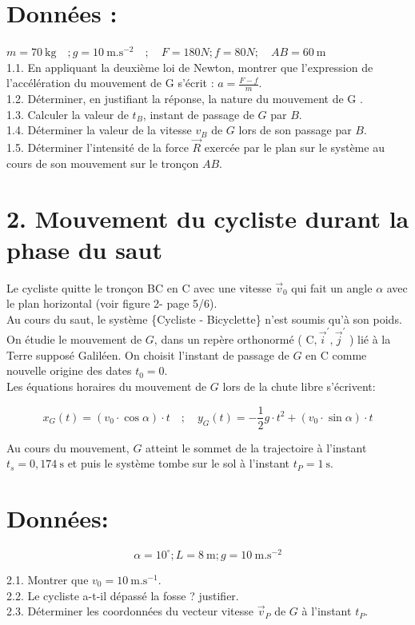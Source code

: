 \section*{Données :}
$m=70 \mathrm{~kg} \quad ; g=10 \mathrm{~m} . \mathrm{s}^{-2} \quad ; \quad F=180 N ; f=80 N ; \quad A B=60 \mathrm{~m}$\\
1.1. En appliquant la deuxième loi de Newton, montrer que l'expression de l'accélération du mouvement de G s'écrit : $a=\frac{F-f}{m}$.\\
1.2. Déterminer, en justifiant la réponse, la nature du mouvement de G .\\
1.3. Calculer la valeur de $t_{B}$, instant de passage de $G$ par $B$.\\
1.4. Déterminer la valeur de la vitesse $v_{B}$ de $G$ lors de son passage par $B$.\\
1.5. Déterminer l'intensité de la force $\vec{R}$ exercée par le plan sur le système au cours de son mouvement sur le tronçon $A B$.

\section*{2. Mouvement du cycliste durant la phase du saut}
Le cycliste quitte le tronçon BC en C avec une vitesse $\vec{v}_{0}$ qui fait un angle $\alpha$ avec le plan horizontal (voir figure 2- page 5/6).\\
Au cours du saut, le système \{Cycliste - Bicyclette\} n'est soumis qu'à son poids. On étudie le mouvement de $G$, dans un repère orthonormé ( $\mathrm{C}, \vec{i}^{\prime}, \vec{j}^{\prime}$ ) lié à la Terre supposé Galiléen. On choisit l'instant de passage de $G$ en C comme nouvelle origine des dates $t_{0}=0$.\\
Les équations horaires du mouvement de $G$ lors de la chute libre s'écrivent:

$$
x_{G}(t)=\left(v_{0} \cdot \cos \alpha\right) \cdot t \quad ; \quad y_{G}(t)=-\frac{1}{2} g \cdot t^{2}+\left(v_{0} \cdot \sin \alpha\right) \cdot t
$$

Au cours du mouvement, $G$ atteint le sommet de la trajectoire à l'instant $t_{s}=0,174 \mathrm{~s}$ et puis le système tombe sur le sol à l'instant $t_{P}=1 \mathrm{~s}$.

\section*{Données:}
$$
\alpha=10^{\circ} ; L=8 \mathrm{~m} ; g=10 \mathrm{~m} . \mathrm{s}^{-2}
$$

2.1. Montrer que $v_{0}=10 \mathrm{~m} . \mathrm{s}^{-1}$.\\
2.2. Le cycliste a-t-il dépassé la fosse ? justifier.\\
2.3. Déterminer les coordonnées du vecteur vitesse $\vec{v}_{P}$ de $G$ à l'instant $t_{P}$.


